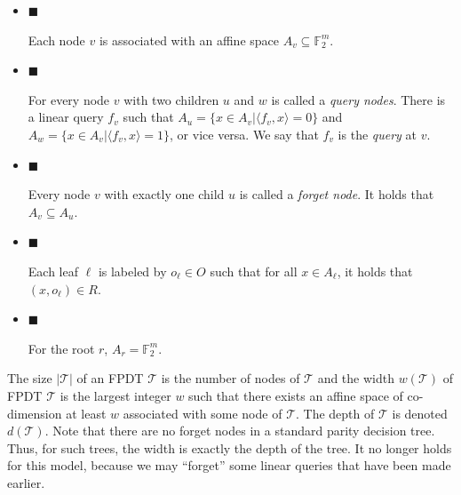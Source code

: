 \documentclass[10pt,a4paper]{article}
\begin{document}
\begin{itemize}


\item[] 
$\blacksquare$ 


Each node $v$ is associated with an affine space $A_{v}\subseteq\mathbb{F}_{2}^{m}$.\par





\item[] 
$\blacksquare$ 


For every node $v$ with two children $u$ and $w$ is called a \emph{query nodes}. There is a linear query $f_{v}$ such that $A_{u}=\{x\in A_{v}|\langle f_{v},x\rangle=0\}$ and $A_{w}=\{x\in A_{v}|\langle f_{v},x\rangle=1\}$, or vice versa.
We say that $f_{v}$ is the \emph{query} at $v$.\par





\item[] 
$\blacksquare$ 


Every node $v$ with exactly one child $u$ is called a \emph{forget node}. It holds that $A_{v}\subseteq A_{u}$.\par





\item[] 
$\blacksquare$ 


Each leaf $\ell$ is labeled by $o_{\ell}\in O$ such that for all $x\in A_{\ell}$, it holds that $(x,o_{\ell})\in R$.\par





\item[] 
$\blacksquare$ 


For the root $r$, $A_{r}=\mathbb{F}_{2}^{m}$.\par





\end{itemize}




The size $|\mathcal{T}|$ of an FPDT $\mathcal{T}$ is the number of nodes of $\mathcal{T}$ and the width $w(\mathcal{T})$ of FPDT $\mathcal{T}$ is the largest integer $w$ such that there exists an affine space of co-dimension at least $w$ associated with some node of $\mathcal{T}$.
The depth of $\mathcal{T}$ is denoted $d(\mathcal{T})$.
Note that there are no forget nodes in a standard parity decision tree.
Thus, for such trees, the width is exactly the depth of the tree.
It no longer holds for this model, because we may “forget” some linear queries that have been made earlier.\par
\end{document}
